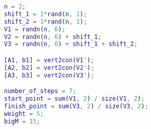 \begin{lstlisting}[language=Matlab]
n = 2;
shift_1 = 1*rand(n, 1);
shift_2 = 1*rand(n, 1);
V1 = randn(n, 6);
V2 = randn(n, 6) + shift_1;
V3 = randn(n, 6) + shift_1 + shift_2;

[A1, b1] = vert2con(V1');
[A2, b2] = vert2con(V2');
[A3, b3] = vert2con(V3');

number_of_steps = 7; 
start_point = sum(V1, 2) / size(V1, 2);
finish_point = sum(V3, 2) / size(V3, 2);
weight = 5;
bigM = 15;
\end{lstlisting}